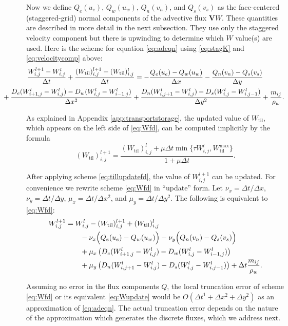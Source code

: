 \documentclass[11pt,final]{amsart}
\newcommand\bV{\mathbf{V}}
\newcommand{\Wtil}{W_{\text{til}}}
\newcommand{\Wtilmax}{W_{\text{til}}^{\text{max}}}
\newcommand{\Wlij}{W^l_{i,j}}
\begin{document}
Now we define $Q_e(u_e)$, $Q_w(u_w)$, $Q_n(v_n)$, and $Q_s(v_s)$ as the face-centered (staggered-grid) normal components of the advective flux $\bV W$.  These quantities are described in more detail in the next subsection.  They use only the staggered velocity component but there is upwinding to determine which $W$ value(s) are used.  Here is the scheme for equation \eqref{eq:adeqn} using \eqref{eq:stagK} and \eqref{eq:velocitycomp} above:
\begin{align}
&\frac{W_{i,j}^{l+1} - W_{i,j}^l}{\Delta t} + \frac{(\Wtil)_{i,j}^{l+1} - (\Wtil)_{i,j}^l}{\Delta t} = - \frac{Q_e(u_e) - Q_w(u_w)}{\Delta x} - \frac{Q_n(v_n) - Q_s(v_s)}{\Delta y}  \label{eq:Wfd} \\
   &\hspace{-0.5in} + \frac{D_e (W_{i+1,j}^l - \Wlij) - D_w (\Wlij - W_{i-1,j}^l)}{\Delta x^2} + \frac{D_n (W_{i,j+1}^l - \Wlij) - D_s (\Wlij - W_{i,j-1}^l)}{\Delta y^2}  + \frac{m_{ij}}{\rho_w}.  \notag
\end{align}

As explained in Appendix \ref{app:transportstorage}, the updated value of $\Wtil$, which appears on the left side of \eqref{eq:Wfd}, can be computed implicitly by the formula
\begin{equation}
(\Wtil)_{i,j}^{l+1} = \frac{(\Wtil)_{i,j}^l + \mu \Delta t \min\{\tau W_{i,j}^l, \Wtilmax\}}{1 + \mu \Delta t}.  \label{eq:tillupdatefd}
\end{equation}

After applying scheme \eqref{eq:tillupdatefd}, the value of $W_{i,j}^{l+1}$ can be updated.  For convenience we rewrite scheme \eqref{eq:Wfd} in ``update'' form.  Let $\nu_x = \Delta t/\Delta x$, $\nu_y = \Delta t/\Delta y$, $\mu_x = \Delta t/\Delta x^2$, and $\mu_y = \Delta t/\Delta y^2$.  The following is equivalent to \eqref{eq:Wfd}:
\begin{align}
 W_{i,j}^{l+1} &= W_{i,j}^l - (\Wtil)_{i,j}^{l+1} + (\Wtil)_{i,j}^l \label{eq:Wupdate} \\
  &\qquad - \nu_x \Big(Q_e(u_e) - Q_w(u_w)\Big) - \nu_y \Big(Q_n(v_n) - Q_s(v_s)\Big) \notag \\
  &\qquad + \mu_x \left(D_e (W_{i+1,j}^l - \Wlij) - D_w (\Wlij - W_{i-1,j}^l)\right) \notag \\
  &\qquad + \mu_y \left(D_n (W_{i,j+1}^l - \Wlij) - D_s (\Wlij - W_{i,j-1}^l)\right) + \Delta t \frac{m_{ij}}{\rho_w}. \notag
\end{align}

Assuming no error in the flux components $Q$, the local truncation error \citep{MortonMayers} of scheme \eqref{eq:Wfd} or its equivalent \eqref{eq:Wupdate} would be $O(\Delta t^1 + \Delta x^2 + \Delta y^2)$ as an approximation of \eqref{eq:adeqn}.  The actual truncation error depends on the nature of the approximation which generates the discrete fluxes, which we address next.
\end{document}
